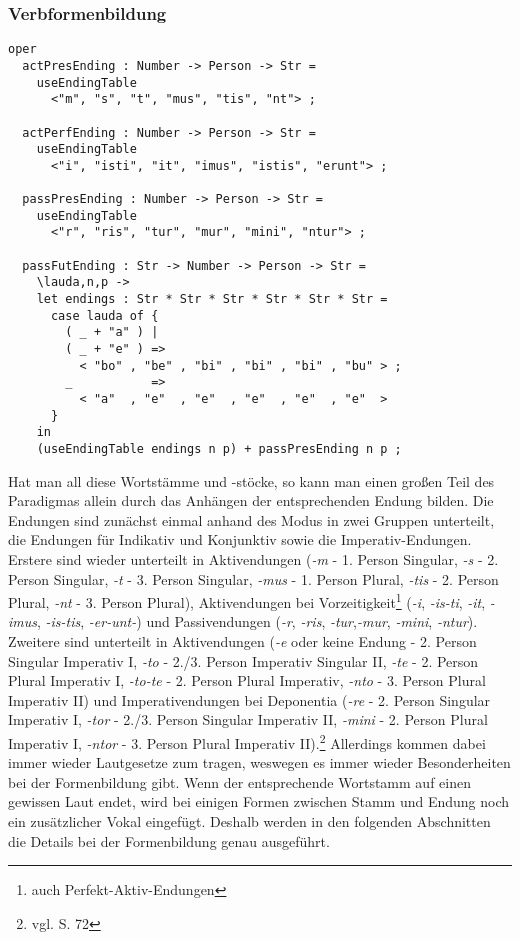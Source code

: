 \subsubsection{Verbformenbildung}
\begin{lstlisting}[float=h!tp,caption={Funktionen um Verbendungen zu bilden und bereitzustellen (vgl. \textbf{ResLat.gf})},label={GF-Morpho-Endings},basicstyle=\small]
oper
  actPresEnding : Number -> Person -> Str = 
    useEndingTable 
      <"m", "s", "t", "mus", "tis", "nt"> ;

  actPerfEnding : Number -> Person -> Str = 
    useEndingTable 
      <"i", "isti", "it", "imus", "istis", "erunt"> ;

  passPresEnding : Number -> Person -> Str =
    useEndingTable 
      <"r", "ris", "tur", "mur", "mini", "ntur"> ;

  passFutEnding : Str -> Number -> Person -> Str = 
    \lauda,n,p ->
    let endings : Str * Str * Str * Str * Str * Str = 
      case lauda of {
        ( _ + "a" ) | 
        ( _ + "e" ) => 
          < "bo" , "be" , "bi" , "bi" , "bi" , "bu" > ;
        _           => 
          < "a"  , "e"  , "e"  , "e"  , "e"  , "e"  >
      }
    in
    (useEndingTable endings n p) + passPresEnding n p ;
\end{lstlisting}
Hat man all diese Wortstämme und -stöcke, so kann man einen großen Teil des Paradigmas allein durch das Anhängen der entsprechenden Endung bilden. Die Endungen sind zunächst einmal anhand des Modus in zwei Gruppen unterteilt, die Endungen für Indikativ und Konjunktiv sowie die Imperativ-Endungen. Erstere sind wieder unterteilt in Aktivendungen (\textit{-m} - 1. Person Singular, \textit{-s} - 2. Person Singular, \textit{-t} - 3. Person Singular, \textit{-mus} - 1. Person Plural, \textit{-tis} - 2. Person Plural, \textit{-nt} - 3. Person Plural), Aktivendungen bei Vorzeitigkeit\footnote{auch Perfekt-Aktiv-Endungen} (\textit{-i}, \textit{-is-ti}, \textit{-it}, \textit{-imus}, \textit{-is-tis}, \textit{-er-unt-}) und Passivendungen (\textit{-r}, \textit{-ris}, \textit{-tur},\textit{-mur}, \textit{-mini}, \textit{-ntur}). Zweitere sind unterteilt in Aktivendungen (\textit{-e} oder keine Endung - 2. Person Singular Imperativ I, \textit{-to} - 2./3. Person Imperativ Singular II, \textit{-te} - 2. Person Plural Imperativ I, \textit{-to-te} - 2. Person Plural Imperativ, \textit{-nto} - 3. Person Plural Imperativ II) und Imperativendungen bei Deponentia (\textit{-re} - 2. Person Singular Imperativ I, \textit{-tor} - 2./3. Person Singular Imperativ II, \textit{-mini} - 2. Person Plural Imperativ I, \textit{-ntor} - 3. Person Plural Imperativ II).\footnote{vgl. \cite{BAYER-LINDAUER1994} S. 72} Allerdings kommen dabei immer wieder Lautgesetze zum tragen, weswegen es immer wieder Besonderheiten bei der Formenbildung gibt. Wenn der entsprechende Wortstamm auf einen gewissen Laut endet, wird bei einigen Formen zwischen Stamm und Endung noch ein zusätzlicher Vokal eingefügt. Deshalb werden in den folgenden Abschnitten die Details bei der Formenbildung genau ausgeführt.\par
\FloatBarrier

